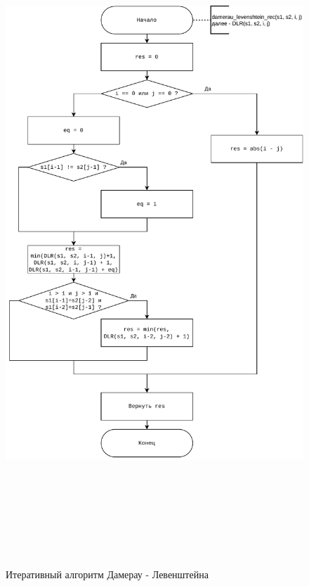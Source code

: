         \begin{figure}
            \centering
            \includegraphics[width=15cm,height=25cm,keepaspectratio]{images/dleven_rec.pdf}
            \caption{Итеративный алгоритм Дамерау - Левенштейна}
            \label{fig:dleven_rec}
        \end{figure}
        
